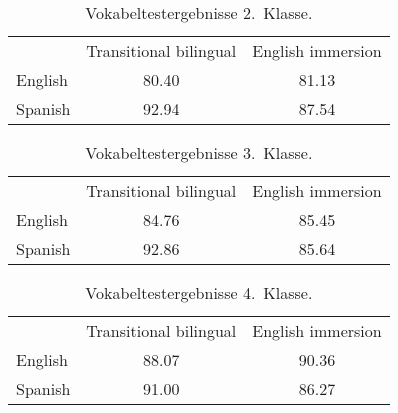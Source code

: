 \documentclass[10pt]{article}\usepackage[]{graphicx}\usepackage[]{xcolor}
\begin{document}
\begin{table}[h]
\centering

\caption{Vokabeltestergebnisse 2.\ Klasse.}
\label{slavin_2}
\begin{tabular}{@{}lcc@{}}
            & Transitional bilingual  & English immersion \\
 English    & 80.40                        & 81.13 \\
 Spanish    & 92.94                        & 87.54
\end{tabular}

\end{table}
\begin{table}[h]
\centering
\caption{Vokabeltestergebnisse 3.\ Klasse.}
\label{slavin_3}
\begin{tabular}{@{}lcc@{}}
            & Transitional bilingual  & English immersion \\
 English    & 84.76                        &  85.45\\
 Spanish    & 92.86                        & 85.64
\end{tabular}
\end{table}

\begin{table}[h!]
\centering
\caption{Vokabeltestergebnisse 4.\ Klasse.}
\label{slavin_4}
\begin{tabular}{@{}lcc@{}}
            & Transitional bilingual  & English immersion \\
 English    & 88.07                        &  90.36\\
 Spanish    & 91.00                        & 86.27
\end{tabular}
\end{table}
\end{document}
